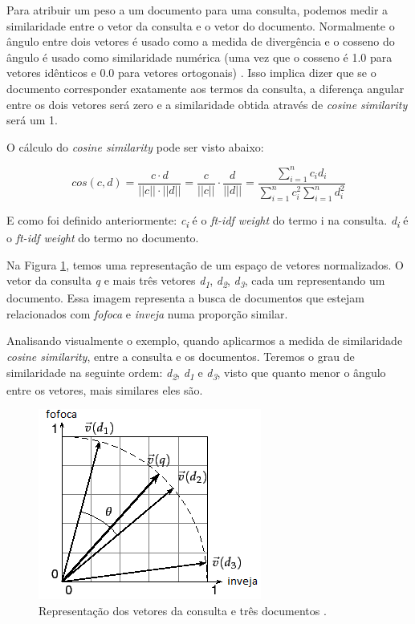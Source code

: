 Para atribuir um peso a um documento para uma consulta, podemos medir a similaridade entre o vetor da consulta e o vetor do documento. Normalmente o ângulo entre dois vetores é usado como a medida de divergência e o cosseno do ângulo é usado como similaridade numérica (uma vez que o cosseno é 1.0 para vetores idênticos e 0.0 para vetores ortogonais) \cite{Singhal2001}. Isso implica dizer que se o documento corresponder exatamente aos termos da consulta, a diferença angular entre os dois vetores será zero e a similaridade obtida através de \textit{cosine similarity} será um 1.

O cálculo do \textit{cosine similarity} pode ser visto abaixo:

\begin{equation}
cos(c, d) = \frac {c \cdot d}{||c|| \cdot ||d||}
= \frac {c}{||c||} \cdot \frac {d}{||d||}
= \frac {\sum_{i=1}^n c_id_i} {\sum_{i=1}^n c_i^2 \sum_{i=1}^n d_i^2}
\label{eq:cosine-sim}
\end{equation}

E como foi definido anteriormente:
\newline 
\textit{c\textsubscript{i}} é o \textit{ft-idf weight} do termo i na consulta.
\newline 
\textit{d\textsubscript{i}} é o \textit{ft-idf weight} do termo no documento.
\newline

Na Figura \ref{fig:espaco_vetorial-doc-consulta}, temos uma representação de um espaço de vetores normalizados. O vetor da consulta \textit{q} e mais três vetores \textit{d\textsubscript{1}}, \textit{d\textsubscript{2}}, \textit{d\textsubscript{3}}, cada um representando um documento. Essa imagem representa a busca de documentos que estejam relacionados com \textit{fofoca} e \textit{inveja} numa proporção similar.

Analisando visualmente o exemplo, quando aplicarmos a medida de similaridade \textit{cosine similarity}, entre a consulta e os documentos. Teremos o grau de similaridade na seguinte ordem: \textit{d\textsubscript{2}}, \textit{d\textsubscript{1}} e \textit{d\textsubscript{3}}, visto que quanto menor o ângulo entre os vetores, mais similares eles são.

\begin{figure}[htb]
	\centering
	\includegraphics[scale=1.0]{chapters/informationretrieval/cosine_similarity.png}
	\caption{Representação dos vetores da consulta e três documentos \citep{Manning2008}.}
	\label{fig:espaco_vetorial-doc-consulta}
\end{figure}

